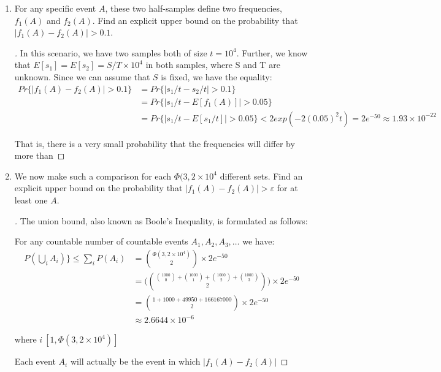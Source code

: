 \documentclass[]{book}
\theoremstyle{definition}
\begin{document}
\begin{enumerate}
\item\label{norms}

For any specific event $A$, these two half-samples define two frequencies, $f_{1}(A)$ and $f_{2}(A)$. Find an explicit upper bound on the probability that $|f_{1}(A) - f_{2}(A)| > 0.1$.

\begin{proof}[\unskip\nopunct]

In this scenario, we have two samples both of size $t = 10^{4}$. Further, we know that $E[s_{1}] = E[s_{2}] = S/T \times 10^{4}$ in both samples, where S and T are unknown. Since we can assume that $S$ is fixed, we have the equality:
	\begin{equation*}
		\begin{split}
		Pr\{|f_{1}(A) - f_{2}(A)| > 0.1\} & = Pr\{|s_{1}/t - s_{2}/t| > 0.1\} \\
		& = Pr\{|s_{1}/t - E[f_{1}(A)]| > 0.05\} \\
		& = Pr\{|s_{1}/t - E[s_{1}/t]| > 0.05\} < 2exp(-2(0.05)^{2}t) = 2e^{-50} \approx 1.93 \times 10^{-22}
		\end{split}
	\end{equation*}

That is, there is a very small probability that the frequencies will differ by more than 
\end{proof}

\item

We now make such a comparison for each $\Phi(3,2 \times 10^{4}$ different sets. Find an explicit upper bound on the probability that $|f_{1}(A) - f_{2}(A)| > \varepsilon$ for at least one $A$.

\begin{proof}[\unskip\nopunct]
The union bound, also known as Boole's Inequality, is formulated as follows:

For any countable number of countable events $A_{1}, A_{2}, A_{3}, \ldots$ we have:
	\begin{equation*}
		\begin{split}
			P(\bigcup_{i} A_{i}) \} \leq \sum_{i}P(A_{i}) & = {\Phi(3,2\times10^{4}) \choose 2} \times 2e^{-50} \\
			& = \Bigg( {{1000 \choose 0} + {1000 \choose 1} + {1000 \choose 2} + {1000 \choose 3} \choose 2}\Bigg) \times 2e^{-50} \\
			& = {1+1000+49950+166167000 \choose 2}\times 2e^{-50} \\
			& \approx 2.6644 \times 10^{-6}
		\end{split}
	\end{equation*} 

where $i \ [1,\Phi(3,2\times10^{4})]$
	
Each event $A_{i}$ will actually be the event in which $|f_{1}(A) - f_{2}(A)|$
\end{proof}


\end{enumerate}
\end{document}
